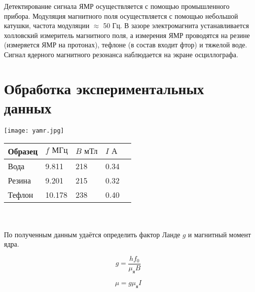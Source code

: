 \documentclass[a4paper, 14pt]{article}
\begin{document}
Детектирование сигнала ЯМР осуществляется с помощью промышленного прибора. Модуляция магнитного поля осуществляется с помощью небольшой катушки, частота модуляции $\approx$ 50 Гц. В зазоре электромагнита устанавливается холловский измеритель магнитного поля, а измерения ЯМР проводятся на резине (измеряется ЯМР на протонах), тефлоне (в состав входит фтор) и тяжелой воде.\\
Сигнал ядерного магнитного резонанса наблюдается на экране осциллографа.




\section*{\textcolor{header}{Обработка экспериментальных данных}}

\begin{minipage}{0.5\textwidth}
    
    \centering
    \texttt{[image: yamr.jpg]}
    \label{<label>}
\end{minipage}
\begin{minipage}{0.5\textwidth}

    \begin{center}
    
    \begin{tabular}{|l|l|l|l|l|}
    \hline
    Образец & $f \text{ МГц}$ & $B \text{ мТл}$ & $I \text{ А}$   \\ \hline
    Вода    & 9.811           & 218             & 0.34            \\ \hline
    Резина  & 9.201           & 215             & 0.32            \\ \hline
    Тефлон  & 10.178          & 238             & 0.40            \\ \hline
    \end{tabular}
\end{center}


\end{minipage}
\\ 
\\ 

По полученным данным удаётся определить фактор Ланде $g$ и магнитный момент ядра.

\begin{equation}
    g = \frac{h f_{0}}{\mu_{\text{я}} B}
\end{equation}



\begin{equation}
    \mu = g  \mu_{\text{я}} I
\end{equation}
\end{document}
